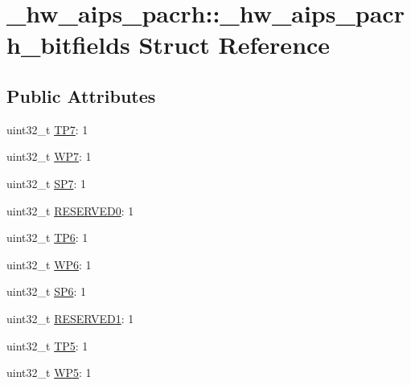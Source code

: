\hypertarget{struct__hw__aips__pacrh_1_1__hw__aips__pacrh__bitfields}{}\section{\+\_\+hw\+\_\+aips\+\_\+pacrh\+:\+:\+\_\+hw\+\_\+aips\+\_\+pacrh\+\_\+bitfields Struct Reference}
\label{struct__hw__aips__pacrh_1_1__hw__aips__pacrh__bitfields}
\subsection*{Public Attributes}
\begin{DoxyCompactItemize}
\item 
uint32\+\_\+t \hyperlink{struct__hw__aips__pacrh_1_1__hw__aips__pacrh__bitfields_a95bbc59914d5cbf11fb30f6508d361f6}{T\+P7}\+: 1
\item 
uint32\+\_\+t \hyperlink{struct__hw__aips__pacrh_1_1__hw__aips__pacrh__bitfields_a1c41ed2030f1bb671aae0614d100864f}{W\+P7}\+: 1
\item 
uint32\+\_\+t \hyperlink{struct__hw__aips__pacrh_1_1__hw__aips__pacrh__bitfields_ad2176c1aa092715b5ead1c31235caba6}{S\+P7}\+: 1
\item 
uint32\+\_\+t \hyperlink{struct__hw__aips__pacrh_1_1__hw__aips__pacrh__bitfields_af7fa79a0584de951f2fa64b9953a5757}{R\+E\+S\+E\+R\+V\+E\+D0}\+: 1
\item 
uint32\+\_\+t \hyperlink{struct__hw__aips__pacrh_1_1__hw__aips__pacrh__bitfields_aad828e59e24601e012071b9eff045710}{T\+P6}\+: 1
\item 
uint32\+\_\+t \hyperlink{struct__hw__aips__pacrh_1_1__hw__aips__pacrh__bitfields_afc19c52ddc384e1b8c6292630ebfe15f}{W\+P6}\+: 1
\item 
uint32\+\_\+t \hyperlink{struct__hw__aips__pacrh_1_1__hw__aips__pacrh__bitfields_a45181b0c8e4655bdc8770e369820bae9}{S\+P6}\+: 1
\item 
uint32\+\_\+t \hyperlink{struct__hw__aips__pacrh_1_1__hw__aips__pacrh__bitfields_adcf3ce15c7141578b68541541f45f16c}{R\+E\+S\+E\+R\+V\+E\+D1}\+: 1
\item 
uint32\+\_\+t \hyperlink{struct__hw__aips__pacrh_1_1__hw__aips__pacrh__bitfields_a220c25029996936b52e66235bf265be2}{T\+P5}\+: 1
\item 
uint32\+\_\+t \hyperlink{struct__hw__aips__pacrh_1_1__hw__aips__pacrh__bitfields_a5e00c644de142f490763c903d9cd83be}{W\+P5}\+: 1

\end{DoxyCompactItemize}
